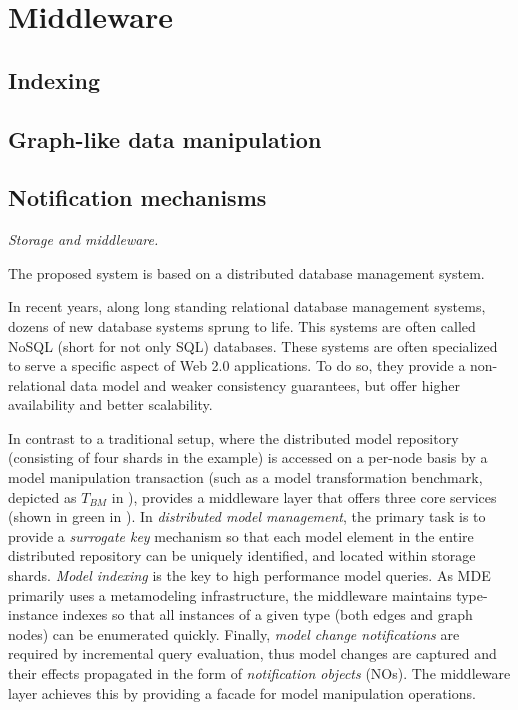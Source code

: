 \section{Middleware}
\label{sec:middleware}

\subsection{Indexing}


\subsection{Graph-like data manipulation}


\subsection{Notification mechanisms}



\emph{Storage and middleware.}\label{storage_and_middleware}

The proposed system is based on a distributed database management system.

In recent years, along long standing relational database management systems, dozens of new database systems sprung to life. This systems are often called NoSQL (short for not only SQL) databases.
These systems are often specialized to serve a specific aspect of Web 2.0 applications. To do so, they provide a non-relational data model and weaker consistency guarantees, but offer higher availability and better scalability.

In contrast to a traditional setup, where the distributed model repository (consisting of four shards in the example) is accessed on a per-node basis by a model manipulation transaction (such as a model transformation benchmark, depicted as $T_{BM}$ in ), \iqd{} provides a middleware layer that offers three core services (shown in green in ).
In {{\em distributed model management}}, the primary task is to provide a \emph{surrogate key} mechanism so that each model element in the entire distributed repository can be uniquely identified, and located within storage shards.
{{\em Model indexing}} is the key to high performance model queries. As MDE primarily uses a metamodeling infrastructure, the \iqd{} middleware maintains type-instance indexes so that all instances of a given type (both edges and graph nodes) can be enumerated quickly.
Finally, {{\em model change notifications}} are required by incremental query evaluation, thus model changes are captured and their effects propagated in the form of \emph{notification objects} (NOs). The middleware layer achieves this by providing a facade for model manipulation operations. 

